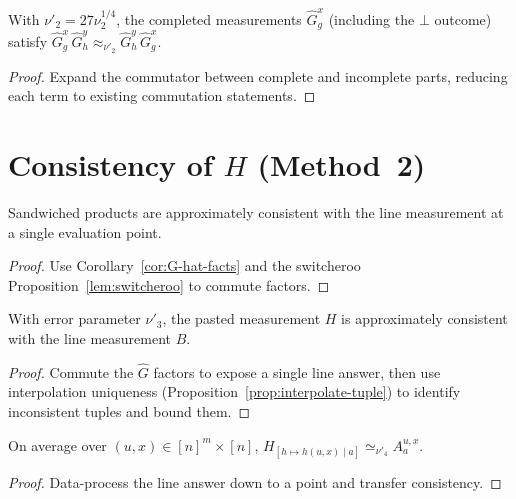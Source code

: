 \begin{corollary}\label{cor:G-hat-facts}
  With $\nu'_2=27\nu_2^{1/4}$, the completed measurements
  $\widehat{G}^x_g$ (including the $\bot$ outcome) satisfy
  $\widehat{G}^x_g\,\widehat{G}^y_h\approx_{\nu'_2}\widehat{G}^y_h\,\widehat{G}^x_g$.
\end{corollary}
\begin{proof}
  Expand the commutator between complete and incomplete parts,
  reducing each term to existing commutation statements.
\end{proof}

\section{Consistency of $H$ (Method~2)}

\begin{lemma}
  \label{lem:ld-sandwich-line-one-point}
  Sandwiched products are approximately consistent with the line measurement
  at a single evaluation point.
\end{lemma}
\begin{proof}
  Use Corollary~\ref{cor:G-hat-facts} and the switcheroo
  Proposition~\ref{lem:switcheroo} to commute factors.
\end{proof}

\begin{lemma}\label{lem:h-b-consistency}
  With error parameter $\nu'_3$, the pasted measurement $H$ is approximately
  consistent with the line measurement $B$.
\end{lemma}
\begin{proof}
  Commute the $\widehat{G}$ factors to expose a single line answer,
  then use interpolation uniqueness (Proposition~\ref{prop:interpolate-tuple})
  to identify inconsistent tuples and bound them.
\end{proof}

\begin{corollary}\label{cor:ha-cons}
  On average over $(u,x)\in[n]^m\times[n]$,
  $H_{[h\mapsto h(u,x)\mid a]}\simeq_{\nu'_4} A^{u,x}_a$.
\end{corollary}
\begin{proof}
  Data-process the line answer down to a point and transfer consistency.
\end{proof}

